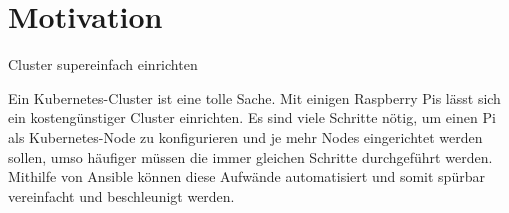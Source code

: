 \chapter{Motivation}
\glqq Cluster supereinfach einrichten\grqq

Ein Kubernetes-Cluster ist eine tolle Sache.
Mit einigen Raspberry Pis lässt sich ein kostengünstiger Cluster einrichten.
Es sind viele Schritte nötig, um einen Pi als Kubernetes-Node zu konfigurieren und je mehr Nodes eingerichtet werden sollen, umso häufiger müssen die immer gleichen Schritte durchgeführt werden.
Mithilfe von Ansible können diese Aufwände automatisiert und somit spürbar vereinfacht und beschleunigt werden.